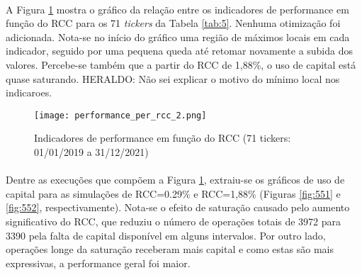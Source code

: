 \paragraph{} A Figura \ref{fig:550} mostra o gráfico da relação entre os indicadores de performance em função do RCC para os 71 \textit{tickers} da Tabela \ref{tab:5}. Nenhuma otimização foi adicionada. Nota-se no início do gráfico uma região de máximos locais em cada indicador, seguido por uma pequena queda até retomar novamente a subida dos valores. Percebe-se também que a partir do RCC de 1,88\%, o uso de capital está quase saturando. \color{red} HERALDO: Não sei explicar o motivo do mínimo local nos indicaroes. \color{black}


\begin{figure}[!htb]
    \texttt{[image: performance\_per\_rcc\_2.png]}
    \centering
    \caption{Indicadores de performance em função do RCC (71 tickers: 01/01/2019 a 31/12/2021)}
    \label{fig:550}
\end{figure}

\paragraph{} Dentre as execuções que compõem a Figura \ref{fig:550}, extraiu-se os gráficos de uso de capital para as simulações de RCC=0.29\% e RCC=1,88\% (Figuras \ref{fig:551} e \ref{fig:552}, respectivamente). Nota-se o efeito de saturação causado pelo aumento significativo do RCC, que reduziu o número de operações totais de 3972 para 3390 pela falta de capital disponível em alguns intervalos. Por outro lado, operações longe da saturação receberam mais capital e como estas são mais expressivas, a performance geral foi maior.



